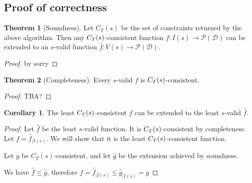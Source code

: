 \documentclass{article}
\theoremstyle{definition}
\theoremstyle{definition}
\theoremstyle{definition}
\newtheorem{theorem}{Theorem}[section]
\theoremstyle{definition}
\theoremstyle{definition}
\newtheorem{corollary}{Corollary}[section]
\begin{document}
\subsection{Proof of correctness}

\begin{theorem}[Soundness]
    Let \( C_T(s) \) be the set of constraints returned by the above algorithm. Then any \(C_T\pars{s}\)-consistent function \( f : I(s) \rightarrow \mathcal{P}(\mathcal{D}) \) can be extended to an \(s\)-valid function \( \widehat f : V(s) \rightarrow \mathcal{P}(\mathcal{D}) \).
\end{theorem}
\begin{proof}
by sorry
\end{proof}

\begin{theorem}[Completeness]
    Every \(s\)-valid \(f\) is \(C_T\pars{s}\)-consistent.
\end{theorem}
\begin{proof}
TBA?
\end{proof}

\begin{corollary}
    The least \(C_T\pars{s}\)-consistent \(f\) can be extended to the least \(s\)-valid \(\widehat{f}\).
\end{corollary}
\begin{proof}
    Let \( \widehat{f} \) be the least \(s\)-valid function. It is \(C_T\pars{s}\)-consistent by completeness. Let \( f = \widehat{f}_{\mid I(s)} \). We will show that it is the least \(C_T\pars{s}\)-consistent function.
    
    Let \( g \) be \(C_T(s) \)-consistent, and let \( \widehat{g} \) be the extension achieved by soundness.
    
    We have \( \widehat{f} \leq \widehat{g} \), therefore \( f = \widehat{f}_{\mid I(s)} \leq \widehat{g}_{\mid I(s)} = g \)
    
\end{proof}
\end{document}

